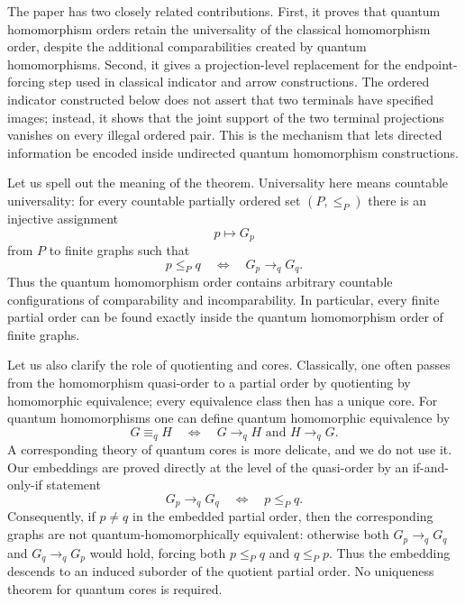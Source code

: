 \documentclass[11pt]{amsart}
\theoremstyle{plain}
\theoremstyle{definition}
\newcommand{\toq}{\to_q}
\begin{document}
The paper has two closely related contributions.  First, it proves that quantum homomorphism orders retain the universality of the classical homomorphism order, despite the additional comparabilities created by quantum homomorphisms.  Second, it gives a projection-level replacement for the endpoint-forcing step used in classical indicator and arrow constructions.  The ordered indicator constructed below does not assert that two terminals have specified images; instead, it shows that the joint support of the two terminal projections vanishes on every illegal ordered pair.  This is the mechanism that lets directed information be encoded inside undirected quantum homomorphism constructions.

Let us spell out the meaning of the theorem.  Universality here means countable universality: for every countable partially ordered set $(P,\le_P)$ there is an injective assignment
\[
   p\longmapsto G_p
\]
from $P$ to finite graphs such that
\[
   p\le_P q
   \quad\Longleftrightarrow\quad
   G_p\toq G_q.
\]
Thus the quantum homomorphism order contains arbitrary countable configurations of comparability and incomparability.  In particular, every finite partial order can be found exactly inside the quantum homomorphism order of finite graphs.

Let us also clarify the role of quotienting and cores.  Classically, one often passes from the homomorphism quasi-order to a partial order by quotienting by homomorphic equivalence; every equivalence class then has a unique core.  For quantum homomorphisms one can define quantum homomorphic equivalence by
\[
   G\equiv_q H
   \quad\Longleftrightarrow\quad
   G\toq H\text{ and }H\toq G.
\]
A corresponding theory of quantum cores is more delicate, and we do not use it.  Our embeddings are proved directly at the level of the quasi-order by an if-and-only-if statement
\[
   G_p\toq G_q
   \quad\Longleftrightarrow\quad
   p\le_P q.
\]
Consequently, if $p\ne q$ in the embedded partial order, then the corresponding graphs are not quantum-homomorphically equivalent: otherwise both $G_p\toq G_q$ and $G_q\toq G_p$ would hold, forcing both $p\le_P q$ and $q\le_P p$.  Thus the embedding descends to an induced suborder of the quotient partial order.  No uniqueness theorem for quantum cores is required.
\end{document}
